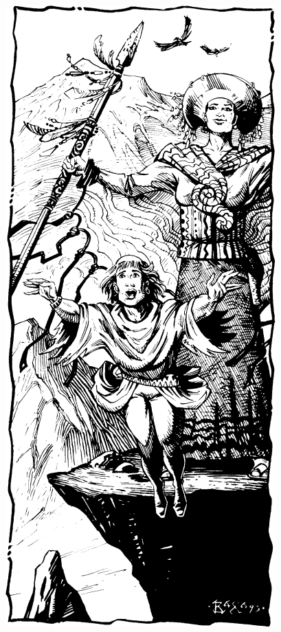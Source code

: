 \begin{figure}[t!]
\centering
\includegraphics[width=\columnwidth]{images/cleric-1.png}
\end{figure}

